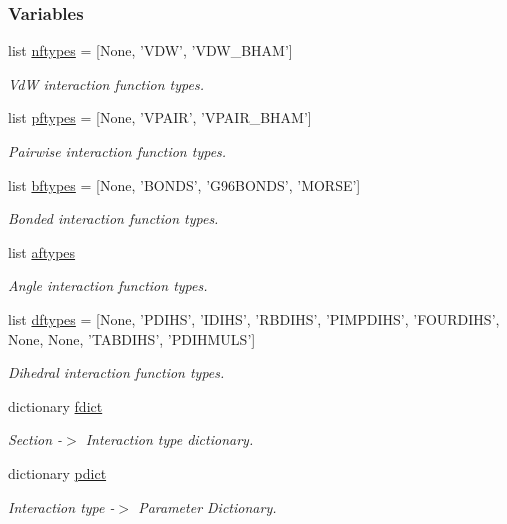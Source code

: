 \subsubsection*{Variables}
\begin{DoxyCompactItemize}
\item 
list \hyperlink{namespaceforcebalance_1_1gmxio_a337bc61280b58a43319380dec9c5529a}{nftypes} = \mbox{[}None, 'V\-D\-W', 'V\-D\-W\-\_\-\-B\-H\-A\-M'\mbox{]}
\begin{DoxyCompactList}\small\item\em Vd\-W interaction function types. \end{DoxyCompactList}\item 
list \hyperlink{namespaceforcebalance_1_1gmxio_a59695b79df36efbe64ac88fd64bfb366}{pftypes} = \mbox{[}None, 'V\-P\-A\-I\-R', 'V\-P\-A\-I\-R\-\_\-\-B\-H\-A\-M'\mbox{]}
\begin{DoxyCompactList}\small\item\em Pairwise interaction function types. \end{DoxyCompactList}\item 
list \hyperlink{namespaceforcebalance_1_1gmxio_a49a34b85d405c9286ceec1e6f088069f}{bftypes} = \mbox{[}None, 'B\-O\-N\-D\-S', 'G96\-B\-O\-N\-D\-S', 'M\-O\-R\-S\-E'\mbox{]}
\begin{DoxyCompactList}\small\item\em Bonded interaction function types. \end{DoxyCompactList}\item 
list \hyperlink{namespaceforcebalance_1_1gmxio_aef89ff391902f81feb14e28ec301296c}{aftypes}
\begin{DoxyCompactList}\small\item\em Angle interaction function types. \end{DoxyCompactList}\item 
list \hyperlink{namespaceforcebalance_1_1gmxio_acd9fed3887161c6386506563fd4f3534}{dftypes} = \mbox{[}None, 'P\-D\-I\-H\-S', 'I\-D\-I\-H\-S', 'R\-B\-D\-I\-H\-S', 'P\-I\-M\-P\-D\-I\-H\-S', 'F\-O\-U\-R\-D\-I\-H\-S', None, None, 'T\-A\-B\-D\-I\-H\-S', 'P\-D\-I\-H\-M\-U\-L\-S'\mbox{]}
\begin{DoxyCompactList}\small\item\em Dihedral interaction function types. \end{DoxyCompactList}\item 
dictionary \hyperlink{namespaceforcebalance_1_1gmxio_a179cbde2e55b4c025af89b225612d6e1}{fdict}
\begin{DoxyCompactList}\small\item\em Section -\/$>$ Interaction type dictionary. \end{DoxyCompactList}\item 
dictionary \hyperlink{namespaceforcebalance_1_1gmxio_ae845e0b923ecde16c79f2742b94534a6}{pdict}
\begin{DoxyCompactList}\small\item\em Interaction type -\/$>$ Parameter Dictionary. \end{DoxyCompactList}\end{DoxyCompactItemize}


